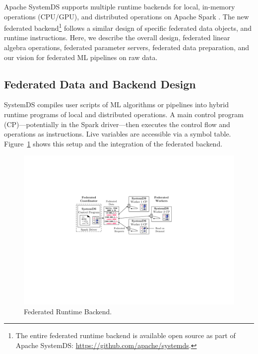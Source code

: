 \documentclass[sigconf,screen]{acmart}
\begin{document}
Apache SystemDS \cite{BoehmADGIKLPR20} supports multiple runtime backends for local, in-memory operations (CPU/GPU), and distributed operations on Apache Spark \cite{ZahariaCDDMMFSS12}. The new federated backend\footnote{The entire federated runtime backend is available open source as part of Apache SystemDS: \url{https://github.com/apache/systemds}.} follows a similar design of specific federated data objects, and runtime instructions. Here, we describe the overall design, federated linear algebra operations, federated parameter servers, federated data preparation, and our vision for federated ML pipelines on raw data. 

\subsection{Federated Data and Backend Design}
\label{sec:design}

SystemDS compiles user scripts of ML algorithms or pipelines into hybrid runtime programs of local and distributed operations. A main control program (CP)---potentially in the Spark driver---then executes the control flow and operations as instructions. Live variables are accessible via a symbol table. Figure~\ref{fig:federated} shows this setup and the integration of the federated backend.

\begin{figure}[!t]
	\centering
	\includegraphics[scale=0.43]{figures/fig02}
	\vspace{-0.25cm}
	\caption{\label{fig:federated}Federated Runtime Backend.}
\end{figure}
\end{document}
